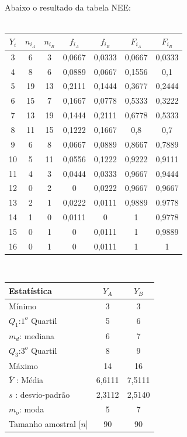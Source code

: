 Abaixo o resultado da tabela NEE:\\
\\
\begin{minipage}{0pt}
\begin{tabular}{ |c|c|c|c|c|c|c| }
\hline
$Y_i$ & $n_{i_A}$ & $n_{i_B}$ & $f_{i_A}$ & $f_{i_B}$ & $F_{i_A}$ & $F_{i_B}$ \\
\hline
3 & 6 & 3 & 0,0667 & 0,0333 & 0,0667 & 0,0333 \\
\hline
4 & 8 & 6 & 0,0889 & 0,0667 & 0,1556 & 0,1 \\
\hline
5 & 19 & 13 & 0,2111 & 0,1444 & 0,3677 & 0,2444 \\
\hline
6 & 15 & 7 & 0,1667 & 0,0778 & 0,5333 & 0,3222 \\
\hline
7 & 13 & 19 & 0,1444 & 0,2111 & 0,6778 & 0,5333 \\
\hline
8 & 11 & 15 & 0,1222 & 0,1667 & 0,8 & 0,7 \\
\hline
9 & 6 & 8 & 0,0667 & 0,0889 & 0,8667 & 0,7889 \\
\hline
10 & 5 & 11 & 0,0556 & 0,1222 & 0,9222 & 0,9111 \\
\hline
11 & 4 & 3 & 0,0444 & 0,0333 & 0,9667 & 0,9444 \\
\hline
12 & 0 & 2 & 0 & 0,0222 & 0,9667 & 0,9667 \\
\hline
13 & 2 & 1 & 0,0222 & 0,0111 & 0,9889 & 0.9778 \\
\hline
14 & 1 & 0 & 0,0111 & 0 & 1 & 0,9778 \\
\hline
15 & 0 & 1 & 0 & 0,0111 & 1 & 0,9889 \\
\hline
16 & 0 & 1 & 0 & 0,0111 & 1 & 1 \\
\hline
\end{tabular}
\end{minipage}
\\
\begin{minipage}[!b]{0.40\linewidth}
\begin{tabular}{ l c c }
\hline
Estatística & $Y_A$ & $Y_B$ \\
\hline
Mínimo & 3 & 3 \\
$Q_1$:$1^o$ Quartil & 5 & 6 \\
$m_d$: mediana & 6 & 7 \\
$Q_3$:$3^o$ Quartil & 8 & 9 \\
Máximo & 14 & 16 \\
\hline
$\bar{Y}$ : Média & 6,6111 & 7,5111 \\
$s$ : desvio-padrão & 2,3112 & 2,5140\\
$m_o$: moda & 5 & 7\\
\hline
Tamanho amostral [$n$] & 90 & 90 \\
\hline
\end{tabular}
\label{Tab:Resulatdos}
\end{minipage}
